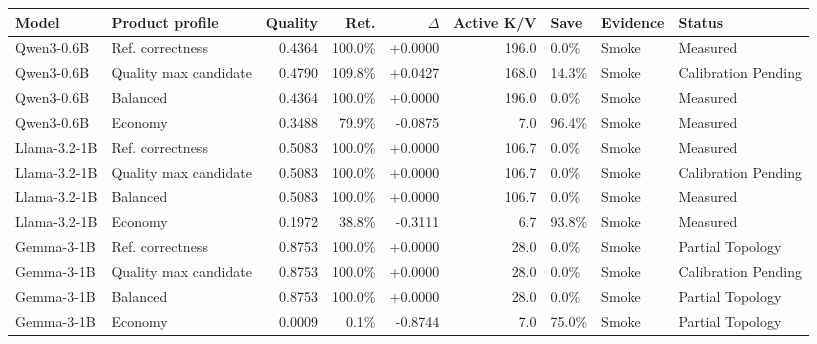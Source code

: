 \begin{tabular}{@{}llrrrrlll@{}}
\toprule
Model & Product profile & Quality & Ret. & $\Delta$ & Active K/V & Save & Evidence & Status\\
\midrule
Qwen3-0.6B & Ref. correctness & 0.4364 & 100.0\% & +0.0000 & 196.0 & 0.0\% & Smoke & Measured\\
Qwen3-0.6B & Quality max candidate & 0.4790 & 109.8\% & +0.0427 & 168.0 & 14.3\% & Smoke & Calibration Pending\\
Qwen3-0.6B & Balanced & 0.4364 & 100.0\% & +0.0000 & 196.0 & 0.0\% & Smoke & Measured\\
Qwen3-0.6B & Economy & 0.3488 & 79.9\% & -0.0875 & 7.0 & 96.4\% & Smoke & Measured\\
Llama-3.2-1B & Ref. correctness & 0.5083 & 100.0\% & +0.0000 & 106.7 & 0.0\% & Smoke & Measured\\
Llama-3.2-1B & Quality max candidate & 0.5083 & 100.0\% & +0.0000 & 106.7 & 0.0\% & Smoke & Calibration Pending\\
Llama-3.2-1B & Balanced & 0.5083 & 100.0\% & +0.0000 & 106.7 & 0.0\% & Smoke & Measured\\
Llama-3.2-1B & Economy & 0.1972 & 38.8\% & -0.3111 & 6.7 & 93.8\% & Smoke & Measured\\
Gemma-3-1B & Ref. correctness & 0.8753 & 100.0\% & +0.0000 & 28.0 & 0.0\% & Smoke & Partial Topology\\
Gemma-3-1B & Quality max candidate & 0.8753 & 100.0\% & +0.0000 & 28.0 & 0.0\% & Smoke & Calibration Pending\\
Gemma-3-1B & Balanced & 0.8753 & 100.0\% & +0.0000 & 28.0 & 0.0\% & Smoke & Partial Topology\\
Gemma-3-1B & Economy & 0.0009 & 0.1\% & -0.8744 & 7.0 & 75.0\% & Smoke & Partial Topology\\
\bottomrule
\end{tabular}
